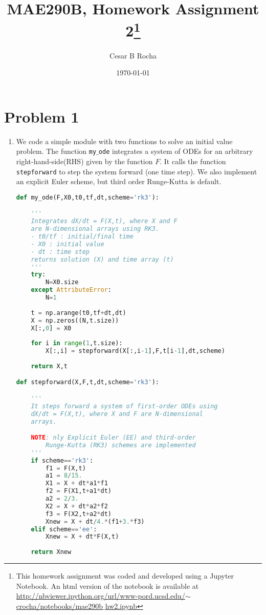 \documentclass[11pt]{article}
\title{MAE290B, Homework Assignment 2\footnote{This homework assignment was coded and developed using a Jupyter Notebook. An html version of the notebook is available at \href{http://nbviewer.ipython.org/url/www-pord.ucsd.edu/~crocha/notebooks/mae290b_hw2.ipynb}{http://nbviewer.ipython.org/url/www-pord.ucsd.edu/$\sim$crocha/notebooks/mae290b$\_$hw2.ipynb}}}
\author{Cesar B Rocha}
\date{\today}
\begin{document}
\maketitle

\section*{Problem 1 }

\begin{enumerate}[label=(\alph*)]

    \item We code a simple module with two functions to solve an initial value problem. The function \texttt{my$\_$ode} integrates a system of ODEs for an arbitrary right-hand-side(RHS) given by the function $F$. It calls the function \texttt{stepforward} to step the system forward (one time step). We also implement an explicit Euler scheme, but third order Runge-Kutta is default. 

\begin{lstlisting}[language=Python]
def my_ode(F,X0,t0,tf,dt,scheme='rk3'):

    '''
    Integrates dX/dt = F(X,t), where X and F 
    are N-dimensional arrays using RK3. 
    - t0/tf : initial/final time
    - X0 : initial value
    - dt : time step
    returns solution (X) and time array (t)
    '''
    try:
        N=X0.size
    except AttributeError:
        N=1
    
    t = np.arange(t0,tf+dt,dt)
    X = np.zeros((N,t.size))
    X[:,0] = X0
    
    for i in range(1,t.size):
        X[:,i] = stepforward(X[:,i-1],F,t[i-1],dt,scheme)
        
    return X,t

def stepforward(X,F,t,dt,scheme='rk3'):

    '''
    It steps forward a system of first-order ODEs using
    dX/dt = F(X,t), where X and F are N-dimensional
    arrays.

    NOTE: nly Explicit Euler (EE) and third-order 
        Runge-Kutta (RK3) schemes are implemented
    '''
    if scheme=='rk3':
        f1 = F(X,t)
        a1 = 8/15.
        X1 = X + dt*a1*f1
        f2 = F(X1,t+a1*dt)
        a2 = 2/3.
        X2 = X + dt*a2*f2
        f3 = F(X2,t+a2*dt)
        Xnew = X + dt/4.*(f1+3.*f3)
    elif scheme=='ee':
        Xnew = X + dt*F(X,t)
            
    return Xnew
\end{lstlisting}


\end{enumerate}
\end{document}
